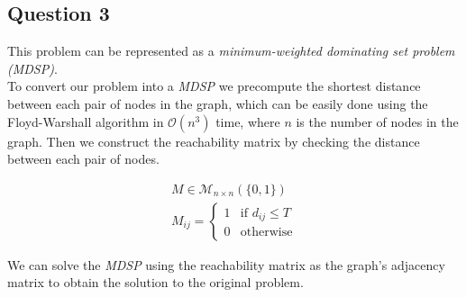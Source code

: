\subsection*{Question 3}

This problem can be represented as a \textit{minimum-weighted dominating set problem (MDSP)}.  \\

To convert our problem into a \textit{MDSP} we precompute the shortest distance between each pair of nodes in the graph, which can be easily done using the Floyd-Warshall algorithm in $\mathcal{O}(n^3)$ time, where $n$ is the number of nodes in the graph.
Then we construct the reachability matrix by checking the distance between each pair of nodes.

\begin{align*}
	M \in \mathcal{M}_{n \times n} (\{0, 1\})  \\
	M_{ij} = \begin{cases}
		1 & \text{if } d_{ij} \leq T \\
		0 & \text{otherwise}
	\end{cases}
\end{align*}

We can solve the \textit{MDSP} using the reachability matrix as the graph's adjacency matrix to obtain the solution to the original problem.
